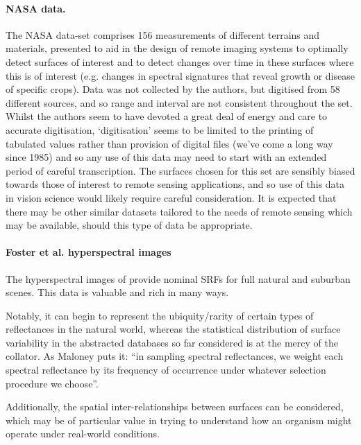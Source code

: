 \paragraph{NASA data.}
The NASA data-set \citep{david_e._bowker_spectral_1985} comprises 156 measurements of different terrains and materials, presented to aid in the design of remote imaging systems to optimally detect surfaces of interest and to detect changes over time in these surfaces where this is of interest (e.g. changes in spectral signatures that reveal growth or disease of specific crops). Data was not collected by the authors, but digitised from 58 different sources, and so range and interval are not consistent throughout the set. Whilst the authors seem to have devoted a great deal of energy and care to accurate digitisation, `digitisation' seems to be limited to the printing of tabulated values rather than provision of digital files (we've come a long way since 1985) and so any use of this data may need to start with an extended period of careful transcription. The surfaces chosen for this set are sensibly biased towards those of interest to remote sensing applications, and so use of this data in vision science would likely require careful consideration. It is expected that there may be other similar datasets tailored to the needs of remote sensing which may be available, should this type of data be appropriate.

\paragraph{Foster et al. hyperspectral images}
The hyperspectral images of \citet{nascimento_statistics_2002,foster_frequency_2006} provide nominal \glspl{SRF} for full natural and suburban scenes. This data is valuable and rich in many ways. 

Notably, it can begin to represent the ubiquity/rarity of certain types of reflectances in the natural world, whereas the statistical distribution of surface variability in the abstracted databases so far considered is at the mercy of the collator. As Maloney puts it: ``in sampling spectral reflectances, we weight each spectral reflectance by its frequency of occurrence under whatever selection procedure we choose''\cite{maloney_computational_1984}.

Additionally, the spatial inter-relationships between surfaces can be considered, which may be of particular value in trying to understand how an organism might operate under real-world conditions.

